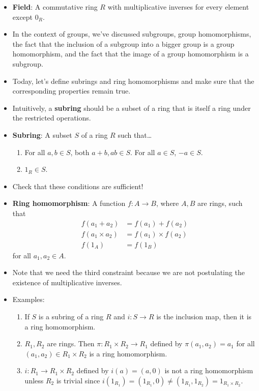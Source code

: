 \documentclass[../notes.tex]{subfiles}
\begin{document}
\begin{itemize}
\begin{enumerate}
    \end{enumerate}
    \item \textbf{Field}: A commutative ring $R$ with multiplicative inverses for every element except $0_R$.
    \item In the context of groups, we've discussed subgroups, group homomorphisms, the fact that the inclusion of a subgroup into a bigger group is a group homomorphism, and the fact that the image of a group homomorphism is a subgroup.
    \item Today, let's define subrings and ring homomorphisms and make sure that the corresponding properties remain true.
    \item Intuitively, a \textbf{subring} should be a subset of a ring that is itself a ring under the restricted operations.
    \item \textbf{Subring}: A subset $S$ of a ring $R$ such that\dots
    \begin{enumerate}[label={(\roman*)}]
        \item For all $a,b\in S$, both $a+b,ab\in S$. For all $a\in S$, $-a\in S$.
        \item $1_R\in S$.
    \end{enumerate}
    \item Check that these conditions are sufficient!
    \item \textbf{Ring homomorphism}: A function $f:A\to B$, where $A,B$ are rings, such that
    \begin{align*}
        f(a_1+a_2) &= f(a_1)+f(a_2)\\
        f(a_1\times a_2) &= f(a_1)\times f(a_2)\\
        f(1_A) &= f(1_B)
    \end{align*}
    for all $a_1,a_2\in A$.
    \item Note that we need the third constraint because we are not postulating the existence of multiplicative inverses.
    \item Examples:
    \begin{enumerate}
        \item If $S$ is a subring of a ring $R$ and $i:S\to R$ is the inclusion map, then it is a ring homomorphism.
        \item $R_1,R_2$ are rings. Then $\pi:R_1\times R_2\to R_1$ defined by $\pi(a_1,a_2)=a_1$ for all $(a_1,a_2)\in R_1\times R_2$ is a ring homomorphism.
        \item $i:R_1\to R_1\times R_2$ defined by $i(a)=(a,0)$ is not a ring homomorphism unless $R_2$ is trivial since $i(1_{R_1})=(1_{R_1},0)\neq (1_{R_1},1_{R_2})=1_{R_1\times R_2}$.

\end{enumerate}
\end{itemize}
\end{document}
